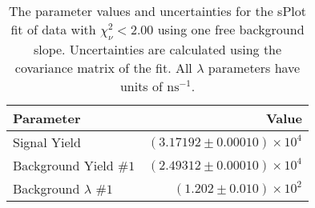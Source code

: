 
\begin{table}[ht]
    \begin{center}
        \begin{tabular}{lr}\toprule
            Parameter & Value \\\midrule
            Signal Yield & $(3.17192 \pm 0.00010) \times 10^{4}$ \\
            Background Yield $\#1$ & $(2.49312 \pm 0.00010) \times 10^{4}$ \\
            Background $\lambda$ $\#1$ & $(1.202 \pm 0.010) \times 10^{2}$ \\\bottomrule
        \end{tabular}
        \caption{The parameter values and uncertainties for the sPlot fit of data with $\chi^2_\nu < 2.00$ using one free background slope. Uncertainties are calculated using the covariance matrix of the fit. All $\lambda$ parameters have units of $\si{\nano\second}^{-1}$.}\label{tab:splot-fit-results-chisqdof-2.00-free-1}
    \end{center}
\end{table}
